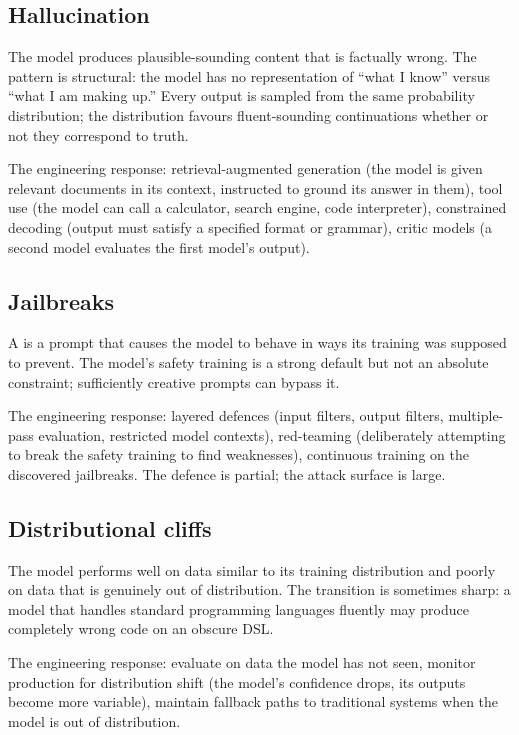\subsection{Hallucination}

The model produces plausible-sounding content that is factually wrong. The pattern is structural: the model has no representation of ``what I know'' versus ``what I am making up.'' Every output is sampled from the same probability distribution; the distribution favours fluent-sounding continuations whether or not they correspond to truth.

The engineering response: retrieval-augmented generation (the model is given relevant documents in its context, instructed to ground its answer in them), tool use (the model can call a calculator, search engine, code interpreter), constrained decoding (output must satisfy a specified format or grammar), critic models (a second model evaluates the first model's output).

\subsection{Jailbreaks}

A  is a prompt that causes the model to behave in ways its training was supposed to prevent. The model's safety training is a strong default but not an absolute constraint; sufficiently creative prompts can bypass it.

The engineering response: layered defences (input filters, output filters, multiple-pass evaluation, restricted model contexts), red-teaming (deliberately attempting to break the safety training to find weaknesses), continuous training on the discovered jailbreaks. The defence is partial; the attack surface is large.

\subsection{Distributional cliffs}

The model performs well on data similar to its training distribution and poorly on data that is genuinely out of distribution. The transition is sometimes sharp: a model that handles standard programming languages fluently may produce completely wrong code on an obscure DSL.

The engineering response: evaluate on data the model has not seen, monitor production for distribution shift (the model's confidence drops, its outputs become more variable), maintain fallback paths to traditional systems when the model is out of distribution.

